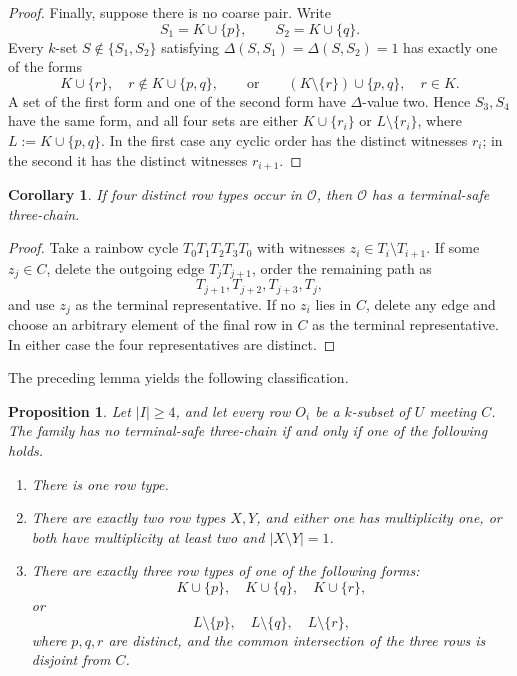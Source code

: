\documentclass[11pt]{amsart}
\newtheorem{proposition}[theorem]{Proposition}
\newtheorem{corollary}[theorem]{Corollary}
\theoremstyle{definition}
\newcommand{\calO}{\mathcal O}
\begin{document}
\begin{proof}
Finally, suppose there is no coarse pair.  Write
\[
  S_1=K\cup\{p\},\qquad S_2=K\cup\{q\}.
\]
Every $k$-set $S\notin\{S_1,S_2\}$ satisfying
$\Delta(S,S_1)=\Delta(S,S_2)=1$ has exactly one of the forms
\[
  K\cup\{r\},\quad r\notin K\cup\{p,q\},
  \qquad\text{or}\qquad
  (K\setminus\{r\})\cup\{p,q\},\quad r\in K.
\]
A set of the first form and one of the second form have $\Delta$-value
two.  Hence $S_3,S_4$ have the same form, and all four sets are either
$K\cup\{r_i\}$ or $L\setminus\{r_i\}$, where
$L:=K\cup\{p,q\}$.  In the first case any cyclic order has the
distinct witnesses $r_i$; in the second it has the distinct witnesses
$r_{i+1}$.
\end{proof}

\begin{corollary}\label{cor:four-types}
If four distinct row types occur in $\calO$, then $\calO$ has a terminal-safe three-chain.
\end{corollary}

\begin{proof}
Take a rainbow cycle $T_0T_1T_2T_3T_0$ with witnesses $z_i\in T_i\setminus T_{i+1}$.  If some $z_j\in C$, delete the outgoing edge $T_jT_{j+1}$, order the remaining path as
\[
  T_{j+1},T_{j+2},T_{j+3},T_j,
\]
and use $z_j$ as the terminal representative.  If no $z_i$ lies in $C$, delete any edge and choose an arbitrary element of the final row in $C$ as the terminal representative.  In either case the four representatives are distinct.
\end{proof}

The preceding lemma yields the following classification.

\begin{proposition}\label{prop:classification}
Let $|I|\ge4$, and let every row $O_i$ be a $k$-subset of $U$ meeting $C$.  The family has no terminal-safe three-chain if and only if one of the following holds.
\begin{enumerate}
\item There is one row type.
\item There are exactly two row types $X,Y$, and either one has multiplicity one, or both have multiplicity at least two and $|X\setminus Y|=1$.
\item There are exactly three row types of one of the following forms:
\[
  K\cup\{p\},\quad K\cup\{q\},\quad K\cup\{r\},
\]
or
\[
  L\setminus\{p\},\quad L\setminus\{q\},\quad L\setminus\{r\},
\]
where $p,q,r$ are distinct, and the common intersection of the three rows is disjoint from $C$.
\end{enumerate}
\end{proposition}
\end{document}
